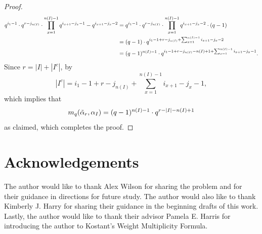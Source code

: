 \documentclass[10pt]{article}
\newcommand{\hr}[0]{\Tilde{\alpha}}
\begin{document}
\begin{proof}
    \begin{align}
        q^{i_1-1}\cdot q^{r-j_{n(I)}} \cdot \prod_{x=1}^{n(I)-1}q^{i_{x+1}-j_x-1}-q^{i_{x+1}-j_x-2}
        &=q^{i_1-1}\cdot q^{r-j_{n(I)}} \cdot \prod_{x=1}^{n(I)-1}q^{i_{x+1}-j_x-2}\cdot (q-1)\notag\\
        &= (q-1)\cdot q^{i_1-1+r-j_{n(I)}+\sum_{x=1}^{n(I)-1}i_{x+1}-j_x-2} \notag\\
        &= (q-1)^{n(I)-1}\cdot q^{i_1-1+r-j_{n(I)}-n(I)+1+\sum_{x=1}^{n(I)-1}i_{x+1}-j_x-1}.\notag\label{eq: IT'S FINALLY OVER}
    \end{align}
    Since $r=|I|+|I^c|$, by 
    \begin{equation}
        |I^c| = i_1-1+r-j_{n(I)} + \sum_{x=1}^{n(I)-1}i_{x+1}-j_x-1,
    \end{equation}
    which implies that
    \begin{equation}
        m_q(\hr_r,\alpha_I) = (q-1)^{n(I)-1}\cdot q^{r-|I|-n(I)+1}\notag
    \end{equation}
    as claimed, which completes the proof.
\end{proof}
\section*{Acknowledgements}
The author would like to thank Alex Wilson for sharing the problem and for their guidance in directions for future study. The author would also like to thank Kimberly J. Harry for sharing their guidance in the beginning drafts of this work. Lastly, the author would like to thank their advisor Pamela E. Harris for introducing the author to Kostant's Weight Multiplicity Formula.


\end{document}
